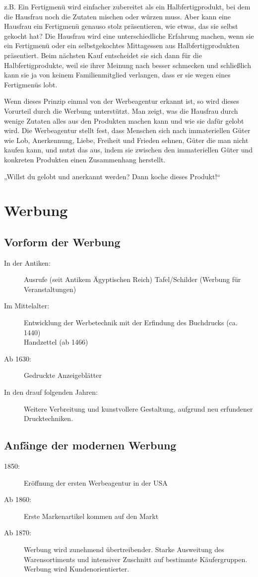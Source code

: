 z.B. Ein Fertigmenü wird einfacher zubereitet als ein Halbfertigprodukt, bei dem die Hausfrau noch
die Zutaten mischen oder würzen muss. Aber kann eine Hausfrau ein Fertigmenü genauso stolz
präsentieren, wie etwas, das sie selbst gekocht hat? Die Hausfrau wird eine unterschiedliche
Erfahrung machen, wenn sie ein Fertigmenü oder ein selbstgekochtes Mittagessen aus
Halbfertigprodukten präsentiert. Beim nächsten Kauf entscheidet sie sich dann für die
Halbfertigprodukte, weil sie ihrer Meinung nach besser schmecken und schließlich kann sie ja von
keinem Familienmitglied verlangen, dass er sie wegen eines Fertigmenüs lobt.

Wenn dieses Prinzip einmal von der Werbeagentur erkannt ist, so wird dieses Vorurteil durch die
Werbung unterstützt. Man zeigt, was die Hausfrau durch wenige Zutaten alles aus den Produkten machen
kann und wie sie dafür gelobt wird. Die Werbeagentur stellt fest, dass Menschen sich nach
immateriellen Güter wie Lob, Anerkennung, Liebe, Freiheit und Frieden sehnen, Güter die man nicht
kaufen kann, und nutzt das aus, indem sie zwischen den immateriellen Güter und konkreten Produkten
einen Zusammenhang herstellt.

„Willst du gelobt und anerkannt werden? Dann koche dieses Produkt!“


\section{Werbung}
\subsection{Vorform der Werbung}

\begin{description}
	\item[In der Antiken:] Ausrufe (seit Antikem Ägyptischen Reich)
Tafel/Schilder (Werbung für Veranstaltungen)

	\item[Im Mittelalter:] Entwicklung der Werbetechnik mit der Erfindung des Buchdrucks
		(ca. 1440) \\
		Handzettel (ab 1466)

	\item[Ab 1630:] Gedruckte Anzeigeblätter
	\item[In den drauf folgenden Jahren:]
		Weitere Verbreitung und kunstvollere Gestaltung, aufgrund neu erfundener Drucktechniken.
\end{description}

\subsection{Anfänge der modernen Werbung}
\begin{description}
	\item[1850:] Eröffnung der ersten Werbeagentur in der USA
	\item[Ab 1860:] Erste Markenartikel kommen auf den Markt
	\item[Ab 1870:] Werbung wird zunehmend übertreibender.
Starke Ausweitung des Warensortiments und intensiver Zuschnitt auf bestimmte Käufergruppen.
Werbung wird Kundenorientierter.
\end{description}

